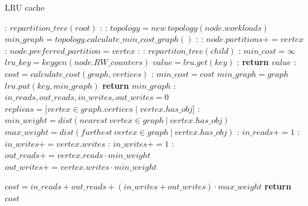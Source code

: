 \begin{algorithm}
  \caption{LRU cache}\label{alg:lru}
  \begin{algorithmic}[1]
    :
  \State $repartition\_tree(root)$
  \EndFunction
  :
    :
      \State $topology = new\ topology(node.workloads)$
      \State $min\_graph =  topology.calculate\_min\_cost\_graph()$
      :
        :
        \State $node.partitions += vertex$
          :
            \State $node.preferred\_partition = vertex$
          \EndIf
        \EndIf
      \EndFor
    \EndIf
    :
      :
        \State $repartiton\_tree(child)$
        \EndFor
    \EndIf
    \EndFunction
    :
    \State $min\_cost = \infty$
    \State $lru\_key = keygen(node.RW\_counters)$
    \State $value = lru.get(key)$
    :
      \State \textbf{return} $value$
    \EndIf
      :
        \State $cost = calculate\_cost(graph, vertices)$
        :
          \State $min\_cost = cost$
          \State $min\_graph = graph$
        \EndIf
      \EndFor
    \State $lru.put(key, min\_graph)$
    \State \textbf{return} $min\_graph$
    \EndFunction
    :
      \State $in\_reads, out\_reads, in\_writes, out\_writes = 0$
      \State $replicas = [vertex \in graph.vertices \mid vertex.has\_obj$]
      :
      \State $min\_weight = dist(nearest\ vertex \in graph\ |\  vertex.has\_obj)$
      \State $max\_weight = dist(furthest\ vertex \in graph\ |\ vertex.has\_obj)$
        :
          \State $in\_reads+= 1$
          :
          \State $in\_writes+= vertex.writes$
          \Else:
          \State  $in\_writes+= 1 $
          \EndIf
        \Else:
          \State $out\_reads += vertex.reads \cdot min\_weight$
          \State $out\_writes += vertex.writes \cdot min\_weight$
        \EndIf
      \EndFor
		\end{algorithmic}
	\end{algorithm}
	\begin{algorithm}
		\begin{algorithmic}[1]
      \State $cost = in\_reads+ out\_reads + (in\_writes+ out\_writes) \cdot max\_weight$
      \State \textbf{return} $cost$
  \EndFunction
  \end{algorithmic}
  \end{algorithm}


